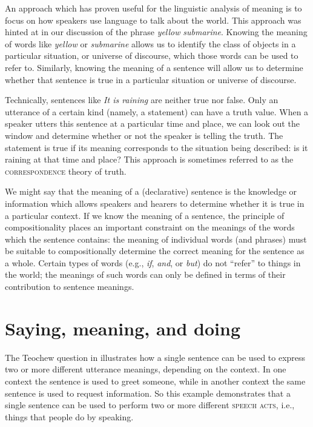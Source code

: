 An approach which has proven useful for the linguistic analysis of meaning is to focus on how speakers use language to talk about the world. This approach was hinted at in our discussion of the phrase \textit{yellow} \textit{submarine}. Knowing the meaning of words like \textit{yellow} or \textit{submarine} allows us to identify the class of objects in a particular situation, or universe of discourse, which those words can be used to refer to. Similarly, knowing the meaning of a sentence will allow us to determine whether that sentence is true in a particular situation or universe of discourse.



Technically, sentences like \textit{It is raining} are neither true nor false. Only an utterance of a certain kind (namely, a statement) can have a truth value. When a speaker utters this sentence at a particular time and place, we can look out the window and determine whether or not the speaker is telling the truth. The statement is true if its meaning corresponds to the situation being described: is it raining at that time and place? This approach is sometimes referred to as the \textsc{correspondence} theory of truth.



We might say that the meaning of a (declarative) sentence is the knowledge or information which allows speakers and hearers to determine whether it is true in a particular context. If we know the meaning of a sentence, the principle of compositionality places an important constraint on the meanings of the words which the sentence contains: the meaning of individual words (and phrases) must be suitable to compositionally determine the correct meaning for the sentence as a whole. Certain types of words (e.g., \textit{if}, \textit{and}, or \textit{but}) do not “refer” to things in the world; the meanings of such words can only be defined in terms of their contribution to sentence meanings.


\section{Saying, meaning, and doing}\label{sec:} %

The Teochew question in  illustrates how a single sentence can be used to express two or more different utterance meanings, depending on the context. In one context the sentence is used to greet someone, while in another context the same sentence is used to request information. So this example demonstrates that a single sentence can be used to perform two or more different \textsc{speech acts}, i.e., things that people do by speaking.



